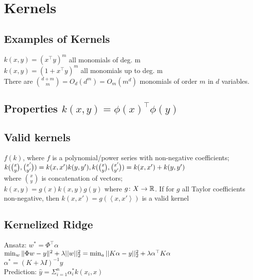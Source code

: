 \section*{Kernels}
\subsection*{Examples of Kernels}
$k(x,y) = (x^\top y)^m$  all monomials of deg. m \\
$k(x,y) = (1+x^\top y)^m$ all monomials up to deg. m\\
There are $\binom{d+m}{m}=O_d(d^m)=O_m(m^d)$ monomials of 
order $m$ in $d$ variables.\\


\subsection*{Properties $k(x,y) = \phi(x)^\top \phi(y)$}


\subsection*{Valid kernels}
$f(k)$, where $f$ is a polynomial/power series with non-negative coefficients;\\
$k(\binom{x}{y}, \binom{x'}{y'})=k(x,x')k(y,y'),\\ 
k(\binom{x}{y}, \binom{x'}{y'})=k(x,x') + k(y,y')$ \\
where $\binom{x}{y}$ is concatenation of vectors;\\
$k(x,y)=g(x)k(x,y)g(y)$ where $g\colon X\to\mathbb{R}$.
If for $g$ all Taylor coefficients non-negative, then $k(x, x') = g(\left< x, x' \right>)$ is a valid kernel

\subsection*{Kernelized Ridge}
Ansatz: $w^*=\Phi^\top\alpha$\\
$\min_w\|\Phi w-y\|^2 + \lambda ||w||_2^2\\
=\min_a ||K\alpha -y||_2^2 + \lambda \alpha^\top K \alpha$\\
$\alpha^*=(K+\lambda I)^{-1} y$\\
Prediction: $\hat{y} = \Sigma_{i=1}^n \alpha_i^* k(x_i,x)$\\